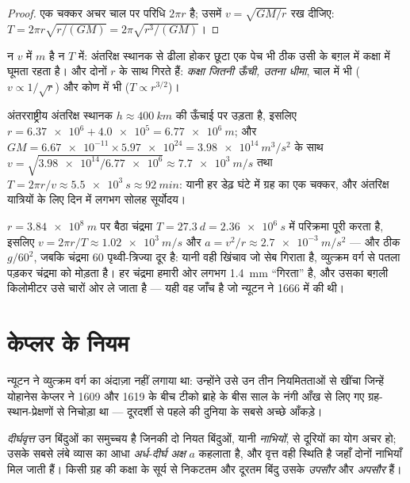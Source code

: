 \begin{proof}
एक चक्कर अचर चाल पर परिधि $2\pi r$ है; उसमें $v = \sqrt{GM/r}$ रख दीजिए: $T = 2\pi r\sqrt{r/(GM)} = 2\pi\sqrt{r^3/(GM)}$।
\end{proof}

न $v$ में $m$ है न $T$ में: अंतरिक्ष स्थानक से ढीला होकर छूटा एक पेच
भी ठीक उसी के बग़ल में कक्षा में घूमता रहता है। और दोनों $r$ के साथ
गिरते हैं: \emph{कक्षा जितनी ऊँची,  उतना धीमा}, चाल में
भी ($v \propto 1/\sqrt r$) और कोण में भी ($T \propto r^{3/2}$)।

\begin{example}[अंतरिक्ष स्थानक]\label{ex:g12:satellites-kepler:iss}
अंतरराष्ट्रीय अंतरिक्ष स्थानक $h \approx \qty{400}{km}$ की ऊँचाई पर उड़ता है, इसलिए $r = \num{6.37e6} + \num{4.0e5} =
\qty{6.77e6}{m}$; और
$GM = \num{6.67e-11} \times \num{5.97e24} =
\qty{3.98e14}{m^3/s^2}$ के साथ $v = \sqrt{\num{3.98e14}/\num{6.77e6}}
\approx \qty{7.7e3}{m/s}$ तथा $T = 2\pi r/v \approx \qty{5.5e3}{s}
\approx \qty{92}{min}$: यानी हर डेढ़ घंटे में ग्रह का एक चक्कर, और
अंतरिक्ष यात्रियों के लिए दिन में लगभग सोलह सूर्योदय।
\end{example}

\begin{example}[चंद्रमा भी सेब की तरह गिरता है]\label{ex:g12:satellites-kepler:moon}
$r = \qty{3.84e8}{m}$ पर बैठा चंद्रमा $T = \qty{27.3}{d} =
\qty{2.36e6}{s}$ में परिक्रमा पूरी करता है, इसलिए $v = 2\pi r/T \approx \qty{1.02e3}{m/s}$
और $a = v^2/r \approx \qty{2.7e-3}{m/s^2}$ --- और ठीक $g/60^2$, जबकि चंद्रमा $60$ पृथ्वी-त्रिज्या दूर है: यानी
वही खिंचाव जो सेब गिराता है, व्युत्क्रम वर्ग से पतला पड़कर चंद्रमा को मोड़ता
है। हर  चंद्रमा हमारी ओर लगभग \qty{1.4}{mm} ``गिरता'' है, और उसका बग़ली किलोमीटर
उसे चारों ओर ले जाता है --- यही वह जाँच है जो न्यूटन ने 1666 में की थी।
\end{example}

\section{केप्लर के नियम}

न्यूटन ने व्युत्क्रम वर्ग का अंदाज़ा नहीं लगाया था: उन्होंने उसे उन तीन
नियमितताओं से खींचा जिन्हें योहानेस केप्लर ने 1609 और 1619 के बीच टीको ब्राहे
के बीस साल के नंगी आँख से लिए गए ग्रह-स्थान-प्रेक्षणों से निचोड़ा था ---
दूरदर्शी से पहले की दुनिया के सबसे अच्छे आँकड़े।

\begin{definition}[दीर्घवृत्त]\label{def:g12:satellites-kepler:ellipse}
\emph{दीर्घवृत्त} उन बिंदुओं का समुच्चय है जिनकी दो नियत
बिंदुओं, यानी \emph{नाभियों}, से दूरियों का योग
अचर हो; उसके सबसे लंबे व्यास का आधा \emph{अर्ध-दीर्घ अक्ष} $a$ कहलाता है, और वृत्त वही स्थिति है जहाँ दोनों नाभियाँ मिल जाती
हैं। किसी ग्रह की कक्षा के सूर्य से निकटतम और दूरतम बिंदु उसके
\emph{उपसौर} और \emph{अपसौर} हैं।
\end{definition}


